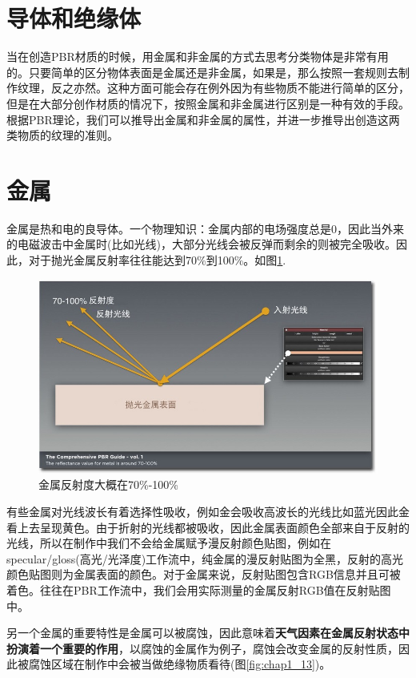 \section{导体和绝缘体}

当在创造PBR材质的时候，用金属和非金属的方式去思考分类物体是非常有用的。只要简单的区分物体表面是金属还是非金属，如果是，那么按照一套规则去制作纹理，反之亦然。这种方面可能会存在例外因为有些物质不能进行简单的区分，但是在大部分创作材质的情况下，按照金属和非金属进行区别是一种有效的手段。根据PBR理论，我们可以推导出金属和非金属的属性，并进一步推导出创造这两类物质的纹理的准则。

\section{金属}

金属是热和电的良导体。一个物理知识：金属内部的电场强度总是0，因此当外来的电磁波击中金属时(比如光线)，大部分光线会被反弹而剩余的则被完全吸收。因此，对于抛光金属反射率往往能达到70\%到100\%。如图\ref{fig:chap1_12}.

\begin{figure}[ht]
    \centering
	\includegraphics[width=\textwidth]{images/chap1_12.jpg}
	\caption{金属反射度大概在70\%-100\%}
    \label{fig:chap1_12}
\end{figure}

有些金属对光线波长有着选择性吸收，例如金会吸收高波长的光线比如蓝光因此金看上去呈现黄色。由于折射的光线都被吸收，因此金属表面颜色全部来自于反射的光线，所以在制作中我们不会给金属赋予漫反射颜色贴图，例如在specular/gloss(高光/光泽度)工作流中，纯金属的漫反射贴图为全黑，反射的高光颜色贴图则为金属表面的颜色。对于金属来说，反射贴图包含RGB信息并且可被着色。往往在PBR工作流中，我们会用实际测量的金属反射RGB值在反射贴图中。

另一个金属的重要特性是金属可以被腐蚀，因此意味着\textbf{天气因素在金属反射状态中扮演着一个重要的作用}，以腐蚀的金属作为例子，腐蚀会改变金属的反射性质，因此被腐蚀区域在制作中会被当做绝缘物质看待(图\ref{fig:chap1_13})。


